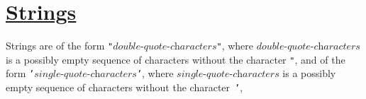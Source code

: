 \section*{\href{https://source-academy.github.io/sicp/chapters/2.3.1.html}{Strings}}

Strings are of the form \texttt{"}$ \textit{double-quote-characters} $\texttt{"},
where $\textit{double-quote-characters}$ is a possibly empty sequence of characters without
the character \texttt{"}, 
and of the form
\texttt{'}$ \textit{single-quote-characters} $\texttt{'},
where $\textit{single-quote-characters}$ is a possibly empty sequence of characters without
the character~\texttt{'}, 
